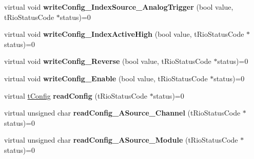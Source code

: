 \begin{DoxyCompactItemize}
\item 
\hypertarget{classnFPGA_1_1nFRC__2012__1__6__4_1_1tEncoder_aa260053fd48a2d1c53411064e0f80675}{
virtual void {\bfseries writeConfig\_\-IndexSource\_\-AnalogTrigger} (bool value, tRioStatusCode $\ast$status)=0}
\label{classnFPGA_1_1nFRC__2012__1__6__4_1_1tEncoder_aa260053fd48a2d1c53411064e0f80675}

\item 
\hypertarget{classnFPGA_1_1nFRC__2012__1__6__4_1_1tEncoder_af666616074045f1655628e71856d4f1f}{
virtual void {\bfseries writeConfig\_\-IndexActiveHigh} (bool value, tRioStatusCode $\ast$status)=0}
\label{classnFPGA_1_1nFRC__2012__1__6__4_1_1tEncoder_af666616074045f1655628e71856d4f1f}

\item 
\hypertarget{classnFPGA_1_1nFRC__2012__1__6__4_1_1tEncoder_a053265b989464cf121b9dea8fe95acc1}{
virtual void {\bfseries writeConfig\_\-Reverse} (bool value, tRioStatusCode $\ast$status)=0}
\label{classnFPGA_1_1nFRC__2012__1__6__4_1_1tEncoder_a053265b989464cf121b9dea8fe95acc1}

\item 
\hypertarget{classnFPGA_1_1nFRC__2012__1__6__4_1_1tEncoder_aab42f4f35bd59260545610055b52a676}{
virtual void {\bfseries writeConfig\_\-Enable} (bool value, tRioStatusCode $\ast$status)=0}
\label{classnFPGA_1_1nFRC__2012__1__6__4_1_1tEncoder_aab42f4f35bd59260545610055b52a676}

\item 
\hypertarget{classnFPGA_1_1nFRC__2012__1__6__4_1_1tEncoder_afee29c9f7782da98fefaac1278e8bcfc}{
virtual \hyperlink{unionnFPGA_1_1nFRC__2012__1__6__4_1_1tEncoder_1_1tConfig}{tConfig} {\bfseries readConfig} (tRioStatusCode $\ast$status)=0}
\label{classnFPGA_1_1nFRC__2012__1__6__4_1_1tEncoder_afee29c9f7782da98fefaac1278e8bcfc}

\item 
\hypertarget{classnFPGA_1_1nFRC__2012__1__6__4_1_1tEncoder_a65974420203694df6433f40b21bcfaeb}{
virtual unsigned char {\bfseries readConfig\_\-ASource\_\-Channel} (tRioStatusCode $\ast$status)=0}
\label{classnFPGA_1_1nFRC__2012__1__6__4_1_1tEncoder_a65974420203694df6433f40b21bcfaeb}

\item 
\hypertarget{classnFPGA_1_1nFRC__2012__1__6__4_1_1tEncoder_a0c199f326fc257b9ef9885067e09708c}{
virtual unsigned char {\bfseries readConfig\_\-ASource\_\-Module} (tRioStatusCode $\ast$status)=0}
\label{classnFPGA_1_1nFRC__2012__1__6__4_1_1tEncoder_a0c199f326fc257b9ef9885067e09708c}


\end{DoxyCompactItemize}

